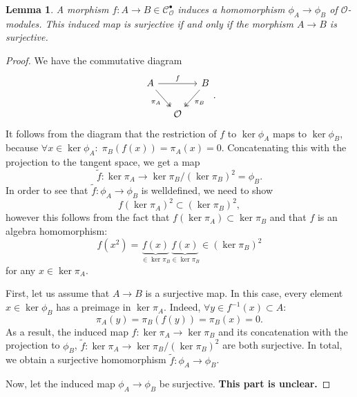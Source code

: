 \documentclass{article}
\theoremstyle{plain}%
\newtheorem{lemma}{Lemma}[section]
\theoremstyle{definition}
\theoremstyle{remark}
\newcommand{\cob}{\mathcal{C}_\mathcal{O}^\bullet}
\begin{document}
    \begin{lemma}\label{lem:surjectivity_phi}
        A morphism \(f\colon A \to B \in \cob\) induces a homomorphism \(\phi_A \to \phi_B\) of \(\mathcal{O}\)-modules.
        This induced map is surjective if and only if the morphism \(A \to B\) is surjective.
    \end{lemma}
    \begin{proof}
        We have the commutative diagram
        \[
        \begin{tikzcd}[column sep=small]
            A \arrow[rr, "f"] \arrow [dr, "\pi_A", swap, twoheadrightarrow] & & B \arrow [dl, "\pi_B", twoheadrightarrow]\\
            & \mathcal{O} &
        \end{tikzcd}.
        \]
        It follows from the diagram that the restriction of \(f\) to \(\ker \phi_A\) maps to \(\ker \phi_B\),
        because \(\forall x \in \ker \phi_A\colon\; \pi_B(f(x)) = \pi_A(x) = 0\).
        Concatenating this with the projection to the tangent space, we get a map
        \[
            \tilde f\colon \ker \pi_A \to \ker \pi_B/(\ker \pi_B)^2 = \phi_B.
        \]
        In order to see that \(\tilde f\colon \phi_A \to \phi_B\) is welldefined, we need to show 
        \[
            f(\ker \pi_A)^2 \subset (\ker \pi_B)^2,
        \]
        however this follows from the fact that \(f(\ker \pi_A) \subset \ker \pi_B\) and that \(f\) is an algebra
        homomorphism:
        \[
            f(x^2) = \underbrace{f(x)}_{\in \ker \pi_B}\underbrace{f(x)}_{\in \ker \pi_B} \in (\ker \pi_B)^2 
        \]
        for any \(x \in \ker \pi_A\).

        First, let us assume that \(A \to B\) is a surjective map.
        In this case, every element \(x \in \ker \phi_B\) has a preimage in \(\ker \pi_A\). Indeed, \(\forall y \in f^{-1}(x)\subset A\colon\)
        \[
            \pi_A(y) = \pi_B(f(y)) = \pi_B(x) = 0.
        \]
        As a result, the induced map \(f\colon \ker \pi_A \to \ker \pi_B\) and its concatenation with
        the projection to \(\phi_B\), \(\tilde f\colon \ker \pi_A \to \ker \pi_B/(\ker \pi_B)^2\) are both surjective.
        In total, we obtain a surjective homomorphism \(\tilde f\colon \phi_A \to \phi_B\).
        
        Now, let the induced map \(\phi_A \to \phi_B\) be surjective. 
        \textbf{This part is unclear.}
    \end{proof}
\end{document}
